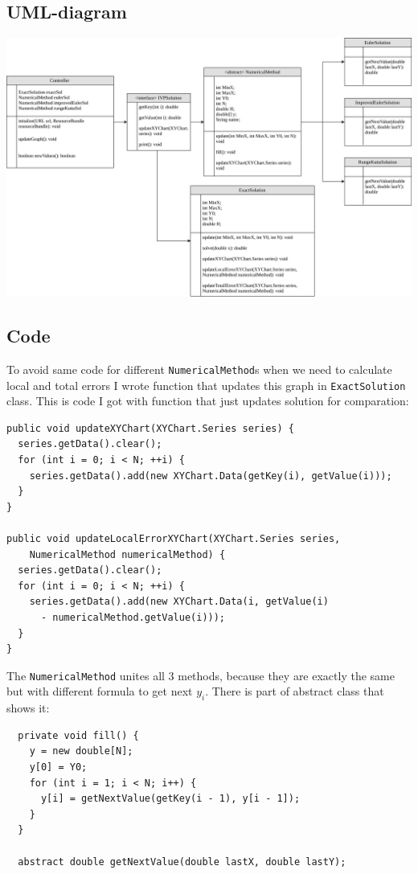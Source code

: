 \documentclass{article}
\begin{document}
\subsection{UML-diagram}
\includegraphics[scale=0.5]{UML.png}

\subsection{Code}
To avoid same code for different \texttt{NumericalMethod}s when we need to calculate local and total errors
I wrote function that updates this graph in \texttt{ExactSolution} class. This is code I got with function 
that just updates solution for comparation: 


\begin{verbatim}
public void updateXYChart(XYChart.Series series) {
  series.getData().clear();
  for (int i = 0; i < N; ++i) {
    series.getData().add(new XYChart.Data(getKey(i), getValue(i)));
  }
}

public void updateLocalErrorXYChart(XYChart.Series series, 
    NumericalMethod numericalMethod) {
  series.getData().clear();
  for (int i = 0; i < N; ++i) {
    series.getData().add(new XYChart.Data(i, getValue(i)
      - numericalMethod.getValue(i)));
  }
}

\end{verbatim}

The \texttt{NumericalMethod} unites all 3 methods, because they are exactly the same
but with different formula to get next $y_i$. There is part of abstract class that shows it:

\begin{verbatim}
  private void fill() {
    y = new double[N];
    y[0] = Y0;
    for (int i = 1; i < N; i++) {
      y[i] = getNextValue(getKey(i - 1), y[i - 1]);
    }
  }

  abstract double getNextValue(double lastX, double lastY);
\end{verbatim}
\end{document}
